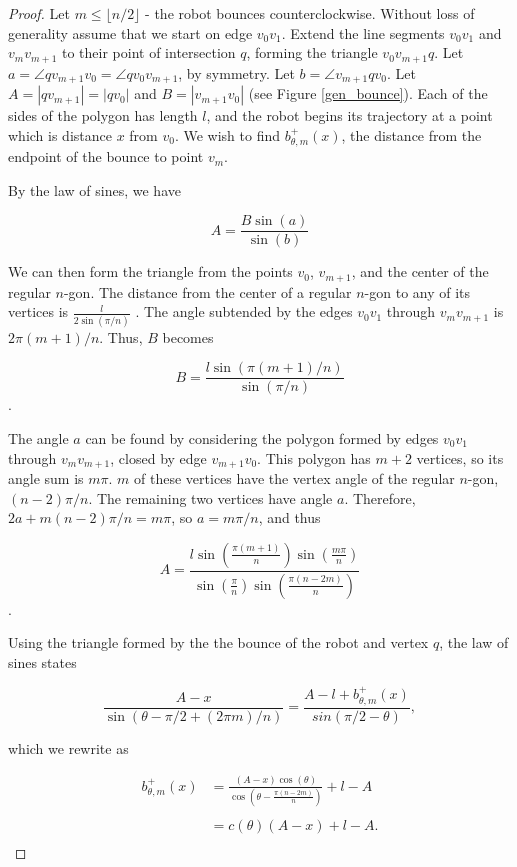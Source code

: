 \documentclass[letterpaper, 10 pt, conference]{ieeeconf}  %
\begin{document}
\begin{proof}
Let $m \leq \lfloor n/2 \rfloor$ - the robot bounces counterclockwise.
Without loss of generality assume that we start on edge $v_0 v_1$.
Extend the line segments $v_0 v_1$ and $v_m v_{m+1}$ to their point of
intersection $q$, forming the triangle $v_0 v_{m+1} q$. Let $a = \angle q
v_{m+1} v_0 = \angle q v_0 v_{m+1}$, by symmetry. Let $b = \angle v_{m+1} q
v_0$. Let $A = |q v_{m+1}| = |q v_0|$ and $B = |v_{m+1} v_0|$ (see Figure
\ref{gen_bounce}). Each of the sides of the polygon has length $l$, and the robot
begins its trajectory at a point which is distance $x$ from $v_0$. We wish to
find $b^+_{\theta,m}(x)$, the distance from the endpoint of the bounce to point
$v_m$.

By the law of sines, we have

$$ A = \frac{B \sin(a)}{\sin(b)} $$

\noindent We can then form the triangle from the points $v_0$, $v_{m+1}$, and the center
of the regular $n$-gon. The distance from the center of a regular $n$-gon to any
of its vertices is $\frac{l}{2 \sin(\pi/n)}$ \cite{johnson1929}. The angle subtended
by the edges $v_0 v_1$ through $v_m v_{m+1}$ is $2 \pi (m+1)/n$. Thus, $B$
becomes

$$ B = \frac{l \sin( \pi (m+1) /n)}{\sin (\pi / n)} $$.

The angle $a$ can be found by considering the polygon formed by edges $v_0 v_1$
through $v_m v_{m+1}$, closed by edge $v_{m+1} v_0$. This polygon has $m+2$
vertices, so its angle sum is $m \pi$. $m$ of these vertices have the vertex
angle of the regular $n$-gon, $(n-2) \pi /n$. The remaining two vertices have
angle $a$. Therefore, $2a + m(n-2)\pi/n = m \pi$, so $a = m \pi / n$, and thus 

$$ A = \frac{l \sin(\frac{\pi(m+1)}{n}) \sin( \frac{m \pi}{n} )}{ \sin(
\frac{\pi}{n} ) \sin( \frac{\pi(n-2m)}{n} ) } $$.

Using the triangle formed by the the bounce of the robot and vertex $q$,
the law of sines states

$$ \frac{A-x}{\sin( \theta - \pi/2 + (2 \pi m)/n )} = \frac{ A - l +
b^+_{\theta,m}(x)}{sin(\pi/2 - \theta)}, $$

\noindent which we rewrite as

\begin{align*}
b^+_{\theta,m}(x) & =\frac{(A-x) \cos(\theta)}{\cos(\theta - \frac{\pi
(n-2m)}{n})} + l -A \\ \\
                & = c(\theta)(A-x)  + l -A. \\
\end{align*}
\end{proof}
\end{document}
